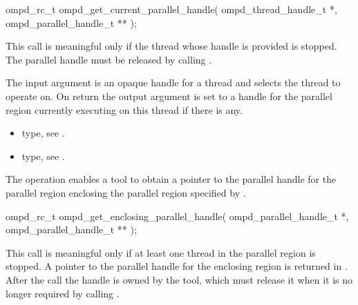 \format

\begin{cspecific}
\begin{ompSyntax}
ompd_rc_t ompd_get_current_parallel_handle(
  ompd_thread_handle_t *,
  ompd_parallel_handle_t **
);
\end{ompSyntax}
\end{cspecific}


\descr
This call is meaningful only if the thread whose handle is provided is stopped. The parallel handle 
must be released by calling .

\argdesc
The input argument  is an opaque handle for a thread and selects the thread to operate on.
On return the output argument  is set to a handle for the parallel region
currently executing on this thread if there is any.

\crossreferences
\begin{itemize}
	\item {} type, see .
	\item {} type, see .
\end{itemize}

\label{ompd:ompd_get_enclosing_parallel_handle}
\summary
The    operation enables a tool to obtain a 
pointer to the parallel handle for the parallel region enclosing the parallel region specified by 
.

\format

\begin{cspecific}
\begin{ompSyntax}
ompd_rc_t ompd_get_enclosing_parallel_handle(
  ompd_parallel_handle_t *,
  ompd_parallel_handle_t **
);
\end{ompSyntax}
\end{cspecific}


\descr
This call is meaningful only if at least one thread in the parallel region is stopped.
A pointer to the parallel handle for the enclosing region is returned in 
. After the call the handle is owned by the tool, which must 
release it when it is no longer required by calling .

